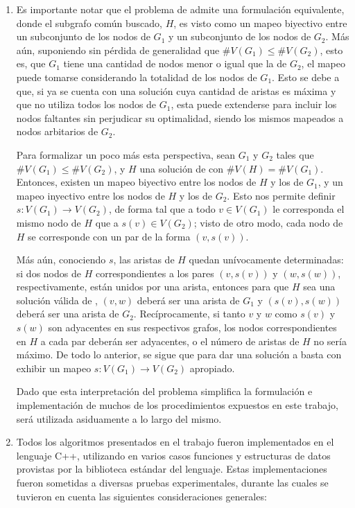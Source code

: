 \begin{enumerate}[label=(\roman*)]
\item Es importante notar que el problema de  admite una formulación
equivalente, donde el subgrafo común buscado, $H$, es visto como un mapeo
biyectivo entre un subconjunto de los nodos de $G_1$ y un subconjunto de los
nodos de $G_2$. Más aún, suponiendo sin pérdida de generalidad que $\#V(G_1)
\leq \#V(G_2)$, esto es, que $G_1$ tiene una cantidad de nodos menor o igual
que la de $G_2$, el mapeo puede tomarse considerando la totalidad de los nodos
de $G_1$. Esto se debe a que, si ya se cuenta con una solución cuya cantidad
de aristas es máxima y que no utiliza todos los nodos de $G_1$, esta puede
extenderse para incluir los nodos faltantes sin perjudicar su optimalidad,
siendo los mismos mapeados a nodos arbitarios de $G_2$.

Para formalizar un poco más esta perspectiva, sean $G_1$ y $G_2$ tales que
$\#V(G_1) \leq \#V(G_2)$, y $H$ una solución de  con $\#V(H) =
\#V(G_1)$. Entonces, existen un mapeo biyectivo entre los nodos de $H$ y los
de $G_1$, y un mapeo inyectivo entre los nodos de $H$ y los de $G_2$. Esto nos
permite definir $s : V(G_1) \to V (G_2)$, de forma tal que a todo $v \in
V(G_1)$ le corresponda el mismo nodo de $H$ que a $s(v) \in V(G_2)$; visto de
otro modo, cada nodo de $H$ se corresponde con un par de la forma $(v, s(v))$.

Más aún, conociendo $s$, las aristas de $H$ quedan unívocamente determinadas:
si dos nodos de $H$ correspondientes a los pares $(v, s(v))$ y $(w, s(w))$,
respectivamente, están unidos por una arista, entonces para que $H$ sea una
solución válida de , $(v, w)$ deberá ser una arista de $G_1$ y
$(s(v), s(w))$ deberá ser una arista de $G_2$. Recíprocamente, si tanto $v$ y
$w$ como $s(v)$ y $s(w)$ son adyacentes en sus respectivos grafos, los nodos
correspondientes en $H$ a cada par deberán ser adyacentes, o el número de
aristas de $H$ no sería máximo. De todo lo anterior, se sigue que para dar una
solución a  basta con exhibir un mapeo $s : V(G_1) \to V (G_2)$
apropiado.

Dado que esta interpretación del problema simplifica la formulación
e implementación de muchos de los procedimientos expuestos en este trabajo,
será utilizada asiduamente a lo largo del mismo.

\item Todos los algoritmos presentados en el trabajo fueron implementados en
el lenguaje C++, utilizando en varios casos funciones y estructuras de datos
provistas por la biblioteca estándar del lenguaje. Estas implementaciones
fueron sometidas a diversas pruebas experimentales, durante las cuales se
tuvieron en cuenta las siguientes consideraciones generales:


\end{enumerate}
